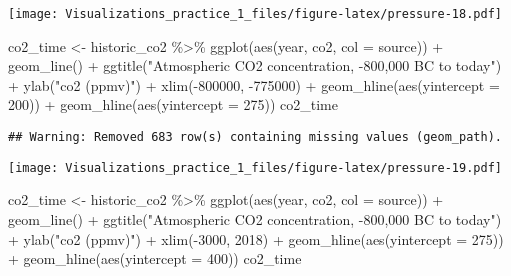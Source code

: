 \documentclass[
]{article}
\newenvironment{Shaded}{\begin{snugshade}}{\end{snugshade}}
\newcommand{\AttributeTok}[1]{\textcolor[rgb]{0.77,0.63,0.00}{#1}}
\newcommand{\DecValTok}[1]{\textcolor[rgb]{0.00,0.00,0.81}{#1}}
\newcommand{\FunctionTok}[1]{\textcolor[rgb]{0.00,0.00,0.00}{#1}}
\newcommand{\NormalTok}[1]{#1}
\newcommand{\OtherTok}[1]{\textcolor[rgb]{0.56,0.35,0.01}{#1}}
\newcommand{\SpecialCharTok}[1]{\textcolor[rgb]{0.00,0.00,0.00}{#1}}
\newcommand{\StringTok}[1]{\textcolor[rgb]{0.31,0.60,0.02}{#1}}
\begin{document}
\texttt{[image: Visualizations\_practice\_1\_files/figure-latex/pressure-18.pdf]}

\begin{Shaded}
\begin{Highlighting}[]
\NormalTok{co2\_time }\OtherTok{\textless{}{-}}\NormalTok{ historic\_co2 }\SpecialCharTok{\%\textgreater{}\%}
  \FunctionTok{ggplot}\NormalTok{(}\FunctionTok{aes}\NormalTok{(year, co2, }\AttributeTok{col =}\NormalTok{ source)) }\SpecialCharTok{+} \FunctionTok{geom\_line}\NormalTok{() }\SpecialCharTok{+}
  \FunctionTok{ggtitle}\NormalTok{(}\StringTok{"Atmospheric CO2 concentration, {-}800,000 BC to today"}\NormalTok{) }\SpecialCharTok{+}
  \FunctionTok{ylab}\NormalTok{(}\StringTok{"co2 (ppmv)"}\NormalTok{) }\SpecialCharTok{+} \FunctionTok{xlim}\NormalTok{(}\SpecialCharTok{{-}}\DecValTok{800000}\NormalTok{, }\SpecialCharTok{{-}}\DecValTok{775000}\NormalTok{) }\SpecialCharTok{+}
  \FunctionTok{geom\_hline}\NormalTok{(}\FunctionTok{aes}\NormalTok{(}\AttributeTok{yintercept =} \DecValTok{200}\NormalTok{)) }\SpecialCharTok{+}
  \FunctionTok{geom\_hline}\NormalTok{(}\FunctionTok{aes}\NormalTok{(}\AttributeTok{yintercept =} \DecValTok{275}\NormalTok{))}
\NormalTok{co2\_time}
\end{Highlighting}
\end{Shaded}

\begin{verbatim}
## Warning: Removed 683 row(s) containing missing values (geom_path).
\end{verbatim}

\texttt{[image: Visualizations\_practice\_1\_files/figure-latex/pressure-19.pdf]}

\begin{Shaded}
\begin{Highlighting}[]
\NormalTok{co2\_time }\OtherTok{\textless{}{-}}\NormalTok{ historic\_co2 }\SpecialCharTok{\%\textgreater{}\%}
  \FunctionTok{ggplot}\NormalTok{(}\FunctionTok{aes}\NormalTok{(year, co2, }\AttributeTok{col =}\NormalTok{ source)) }\SpecialCharTok{+} \FunctionTok{geom\_line}\NormalTok{() }\SpecialCharTok{+}
  \FunctionTok{ggtitle}\NormalTok{(}\StringTok{"Atmospheric CO2 concentration, {-}800,000 BC to today"}\NormalTok{) }\SpecialCharTok{+}
  \FunctionTok{ylab}\NormalTok{(}\StringTok{"co2 (ppmv)"}\NormalTok{) }\SpecialCharTok{+} \FunctionTok{xlim}\NormalTok{(}\SpecialCharTok{{-}}\DecValTok{3000}\NormalTok{, }\DecValTok{2018}\NormalTok{) }\SpecialCharTok{+}
  \FunctionTok{geom\_hline}\NormalTok{(}\FunctionTok{aes}\NormalTok{(}\AttributeTok{yintercept =} \DecValTok{275}\NormalTok{)) }\SpecialCharTok{+}
  \FunctionTok{geom\_hline}\NormalTok{(}\FunctionTok{aes}\NormalTok{(}\AttributeTok{yintercept =} \DecValTok{400}\NormalTok{))}
\NormalTok{co2\_time}
\end{Highlighting}
\end{Shaded}
\end{document}
